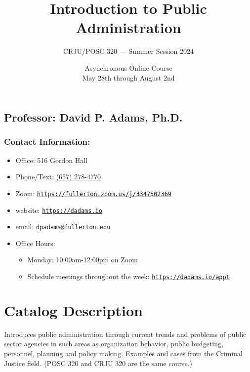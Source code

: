 \documentclass[11pt, letterpaper]{article}
\begin{document}
\thispagestyle{firstpage}

\title{\textbf{Introduction to Public Administration}}
\author{CRJU/POSC 320 — Summer Session 2024}
\date{Asynchronous Online Course \\
May 28th through August 2nd}
\maketitle


\subsection*{Professor: David P. Adams, Ph.D.}

\subsubsection*{Contact Information:}


\begin{itemize}
	\item Office: 516 Gordon Hall
	\item Phone/Text: \href{tel:+16572784770}{(657) 278-4770}
	\item Zoom: \href{https://fullerton.zoom.us/j/3347502369}{\texttt{https://fullerton.zoom.us/j/3347502369}}
	\item website: \href{https://dadams.io}{\texttt{https://dadams.io}}
	\item email: \href{dpadams@fullerton.edu}{\texttt{dpadams@fullerton.edu}}
	\item Office Hours:
        \begin{itemize}
            \item Monday: 10:00am-12:00pm on Zoom
            \item Schedule meetings throughout the week: \href{https://dadams.io/appt}{\texttt{https://dadams.io/appt}}
        \end{itemize}  
\end{itemize}


\section{Catalog Description}

Introduces public administration through current trends and problems of public sector agencies in such areas as organization behavior, public budgeting, personnel, planning and policy making. Examples and cases from the Criminal Justice field. (POSC 320 and CRJU 320 are the same course.)
\end{document}
